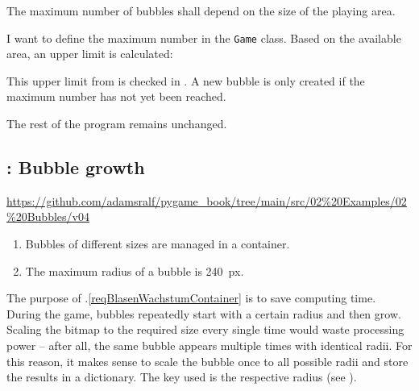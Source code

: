 	The maximum number of bubbles shall depend on the size of the playing area.
\er

I want to define the maximum number in the \texttt{Game} class. Based on the available area, an upper limit is calculated:


This upper limit from  is checked in . A new bubble is only created if the maximum number has not yet been reached.


The rest of the program remains unchanged.

\subsection{: Bubble growth}
\begin{diskbox}
	\url{https://github.com/adamsralf/pygame_book/tree/main/src/02%20Examples/02%20Bubbles/v04}
\end{diskbox}

\begin{enumerate}
	\item Bubbles of different sizes are managed in a container.\label{reqBlasenWachstumContainer}
	
	\item The maximum radius of a bubble is \SI{240}{px}.\label{reqBlasenWachstumMax}
\end{enumerate}
\er

The purpose of .\ref{reqBlasenWachstumContainer} is to save computing time. During the game, bubbles repeatedly start with a certain radius and then grow. Scaling the bitmap to the required size every single time would waste processing power -- after all, the same bubble appears multiple times with identical radii. For this reason, it makes sense to scale the bubble once to all possible radii and store the results in a dictionary. The key used is the respective radius (see ).

